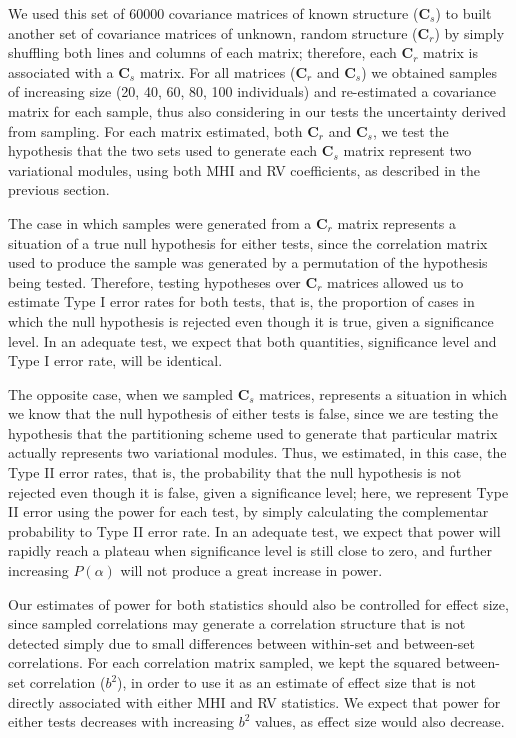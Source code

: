 \documentclass[12pt,]{article}
\begin{document}
We used this set of 60000 covariance matrices of known structure
($\mathbf{C}_s$) to built another set of covariance matrices of unknown,
random structure ($\mathbf{C}_r$) by simply shuffling both lines and
columns of each matrix; therefore, each $\mathbf{C}_r$ matrix is
associated with a $\mathbf{C}_s$ matrix. For all matrices
($\mathbf{C}_r$ and $\mathbf{C}_s$) we obtained samples of increasing
size (20, 40, 60, 80, 100 individuals) and re-estimated a covariance
matrix for each sample, thus also considering in our tests the
uncertainty derived from sampling. For each matrix estimated, both
$\mathbf{C}_r$ and $\mathbf{C}_s$, we test the hypothesis that the two
sets used to generate each $\mathbf{C}_s$ matrix represent two
variational modules, using both MHI and RV coefficients, as described in
the previous section.

The case in which samples were generated from a $\mathbf{C}_r$ matrix
represents a situation of a true null hypothesis for either tests, since
the correlation matrix used to produce the sample was generated by a
permutation of the hypothesis being tested. Therefore, testing
hypotheses over $\mathbf{C}_r$ matrices allowed us to estimate Type I
error rates for both tests, that is, the proportion of cases in which
the null hypothesis is rejected even though it is true, given a
significance level. In an adequate test, we expect that both quantities,
significance level and Type I error rate, will be identical.

The opposite case, when we sampled $\mathbf{C}_s$ matrices, represents a
situation in which we know that the null hypothesis of either tests is
false, since we are testing the hypothesis that the partitioning scheme
used to generate that particular matrix actually represents two
variational modules. Thus, we estimated, in this case, the Type II error
rates, that is, the probability that the null hypothesis is not rejected
even though it is false, given a significance level; here, we represent
Type II error using the power for each test, by simply calculating the
complementar probability to Type II error rate. In an adequate test, we
expect that power will rapidly reach a plateau when significance level
is still close to zero, and further increasing $P(\alpha)$ will not
produce a great increase in power.

Our estimates of power for both statistics should also be controlled for
effect size, since sampled correlations may generate a correlation
structure that is not detected simply due to small differences between
within-set and between-set correlations. For each correlation matrix
sampled, we kept the squared between-set correlation ($b^2$), in order
to use it as an estimate of effect size that is not directly associated
with either MHI and RV statistics. We expect that power for either tests
decreases with increasing $b^2$ values, as effect size would also
decrease.
\end{document}
